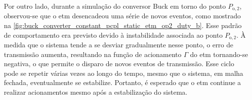 Por outro lado, durante a simulação do conversor Buck em torno do ponto $P_{\mathrm{o}, 2}$, observou-se que o \acrshort{etm} desencadeou uma série de novos eventos, como mostrado na \autoref{fig:buck_converter_constant_pcpl_static_etm_op2_duty_b}. Esse padrão de comportamento era previsto devido à instabilidade associada ao ponto $P_{\mathrm{o}, 2}$. À medida que o sistema tende a se desviar gradualmente nesse ponto, o erro de transmissão aumenta, resultando na função de acionamento $\Gamma$ do \acrshort{etm} tornando-se negativa, o que permite o disparo de novos eventos de transmissão. Esse ciclo pode se repetir várias vezes ao longo do tempo, mesmo que o sistema, em malha fechada, eventualmente se estabilize. Portanto, é esperado que o \acrshort{etm} continue a realizar acionamentos mesmo após a estabilização do sistema.

